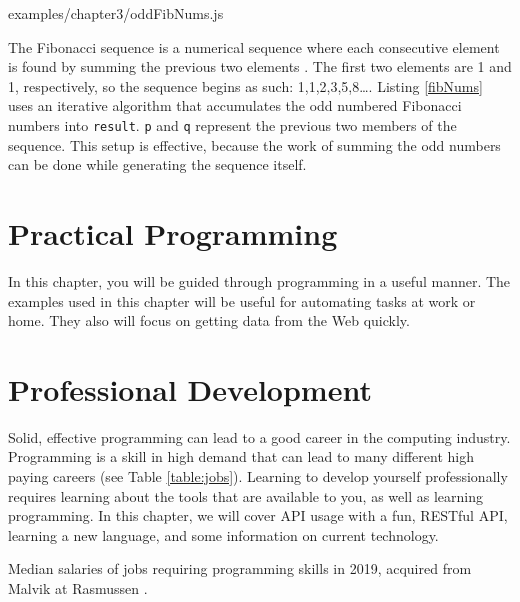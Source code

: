 \documentclass[12pt, oneside, a4paper]{book}
\begin{document}
         
         {examples/chapter3/oddFibNums.js}

         The Fibonacci sequence is a numerical sequence where each consecutive element is found by summing the previous two elements \autocite{parshallFibonacciSequence}.
         The first two elements are 1 and 1, respectively, so the sequence begins as such: 1,1,2,3,5,8\ldots.
         Listing \ref{fibNums} uses an iterative algorithm that accumulates the odd numbered Fibonacci numbers into \lstinline!result!.
         \lstinline!p! and \lstinline!q! represent the previous two members of the sequence.
         This setup is effective, because the work of summing the odd numbers can be done while generating the sequence itself.

   \chapter{Practical Programming}
   \label{chap:practical}
      In this chapter, you will be guided through programming in a useful manner.
      The examples used in this chapter will be useful for automating tasks at work or home.
      They also will focus on getting data from the Web quickly.
   \chapter{Professional Development}
   \label{chap:prof_devel}
      Solid, effective programming can lead to a good career in the computing industry.
      Programming is a skill in high demand that can lead to many different high paying careers (see Table \ref*{table:jobs}).
      Learning to develop yourself professionally requires learning about the tools that are available to you, as well as learning programming.
      In this chapter, we will cover API usage with a fun, RESTful API, learning a new language, and some information on current technology.
      \begin{table}[H]
         \caption{
            Median salaries of jobs requiring programming skills in 2019, acquired from Malvik at Rasmussen \autocite{malvikProgrammingCareersCoding}.
         }
         \label{table:jobs}
      \end{table}
\end{document}
